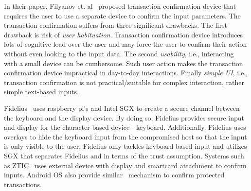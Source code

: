  In their paper, Filyanov et. al~\cite{filyanov2011uni} proposed transaction confirmation device that requires the user to use a separate device to confirm the input parameters. The transaction confirmation suffers from three significant drawbacks. The first drawback is risk of \emph{user habituation}. Transaction confirmation device introduces lots of cognitive load over the user and may force the user to confirm their action without even looking to the input data. The second \emph{usability}, i.e., interacting with a small device can be cumbersome. Such user action makes the transaction confirmation device impractical in day-to-day interactions. Finally \emph{simple UI}, i.e., transaction confirmation is not practical/suitable for complex interaction, rather simple text-based inputs. 


  Fidelius~\cite{Fidelius} uses raspberry pi's and Intel SGX to create a secure channel between the keyboard and the display device. By doing so, Fidelius provides secure input and display for the character-based device - keyboard. Additionally, Fidelius uses overlays to hide the keyboard input from the compromised host so that the input is only visible to the user. Fidelius only tackles keyboard-based input and utilizes SGX that separates Fidelius and \name in terms of the trust assumption. Systems such as ZTIC~\cite{weigold2011secure} uses external device with display and smartcard attachment to confirm inputs. Android OS also provide similar~\cite{android_confirm} mechanism to confirm protected transactions.

